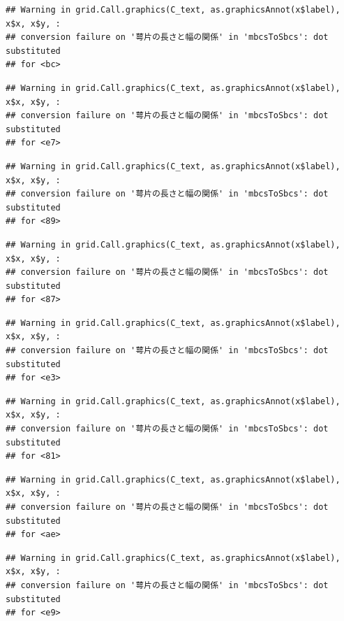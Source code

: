 \documentclass[
]{book}
\begin{document}
\begin{verbatim}
## Warning in grid.Call.graphics(C_text, as.graphicsAnnot(x$label), x$x, x$y, :
## conversion failure on '萼片の長さと幅の関係' in 'mbcsToSbcs': dot substituted
## for <bc>
\end{verbatim}

\begin{verbatim}
## Warning in grid.Call.graphics(C_text, as.graphicsAnnot(x$label), x$x, x$y, :
## conversion failure on '萼片の長さと幅の関係' in 'mbcsToSbcs': dot substituted
## for <e7>
\end{verbatim}

\begin{verbatim}
## Warning in grid.Call.graphics(C_text, as.graphicsAnnot(x$label), x$x, x$y, :
## conversion failure on '萼片の長さと幅の関係' in 'mbcsToSbcs': dot substituted
## for <89>
\end{verbatim}

\begin{verbatim}
## Warning in grid.Call.graphics(C_text, as.graphicsAnnot(x$label), x$x, x$y, :
## conversion failure on '萼片の長さと幅の関係' in 'mbcsToSbcs': dot substituted
## for <87>
\end{verbatim}

\begin{verbatim}
## Warning in grid.Call.graphics(C_text, as.graphicsAnnot(x$label), x$x, x$y, :
## conversion failure on '萼片の長さと幅の関係' in 'mbcsToSbcs': dot substituted
## for <e3>
\end{verbatim}

\begin{verbatim}
## Warning in grid.Call.graphics(C_text, as.graphicsAnnot(x$label), x$x, x$y, :
## conversion failure on '萼片の長さと幅の関係' in 'mbcsToSbcs': dot substituted
## for <81>
\end{verbatim}

\begin{verbatim}
## Warning in grid.Call.graphics(C_text, as.graphicsAnnot(x$label), x$x, x$y, :
## conversion failure on '萼片の長さと幅の関係' in 'mbcsToSbcs': dot substituted
## for <ae>
\end{verbatim}

\begin{verbatim}
## Warning in grid.Call.graphics(C_text, as.graphicsAnnot(x$label), x$x, x$y, :
## conversion failure on '萼片の長さと幅の関係' in 'mbcsToSbcs': dot substituted
## for <e9>
\end{verbatim}
\end{document}
